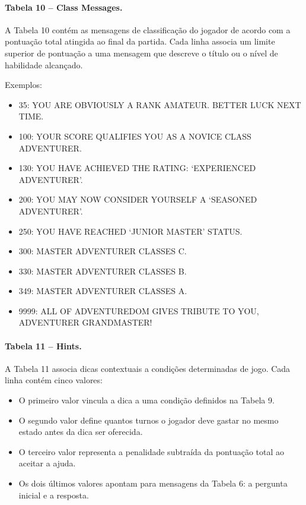 \documentclass[12pt,a4paper]{article}
\begin{document}
\paragraph{Tabela 10 – Class Messages.}
A Tabela 10 contém as mensagens de classificação do jogador de acordo com a pontuação total atingida ao final da partida. Cada linha associa um limite superior de pontuação a uma mensagem que descreve o título ou o nível de habilidade alcançado.  

Exemplos:
\begin{itemize}
  \item 35: YOU ARE OBVIOUSLY A RANK AMATEUR.  BETTER LUCK NEXT TIME.
  \item 100: YOUR SCORE QUALIFIES YOU AS A NOVICE CLASS ADVENTURER.
  \item 130: YOU HAVE ACHIEVED THE RATING: ‘EXPERIENCED ADVENTURER’.
  \item 200: YOU MAY NOW CONSIDER YOURSELF A ‘SEASONED ADVENTURER’.
  \item 250: YOU HAVE REACHED ‘JUNIOR MASTER’ STATUS.
  \item 300: MASTER ADVENTURER CLASSES C.
  \item 330: MASTER ADVENTURER CLASSES B.
  \item 349: MASTER ADVENTURER CLASSES A.
  \item 9999: ALL OF ADVENTUREDOM GIVES TRIBUTE TO YOU, ADVENTURER GRANDMASTER!
\end{itemize}

\paragraph{Tabela 11 – Hints.}
A Tabela 11 associa dicas contextuais a condições determinadas de jogo.  
Cada linha contém cinco valores:  

\begin{itemize}
  \item O primeiro valor vincula a dica a uma condição definidos na Tabela 9.
  \item O segundo valor define quantos turnos o jogador deve gastar no mesmo estado antes da dica ser oferecida.
  \item O terceiro valor representa a penalidade subtraída da pontuação total ao aceitar a ajuda.
  \item Os dois últimos valores apontam para mensagens da Tabela 6: a pergunta inicial e a resposta.
\end{itemize}
\end{document}

